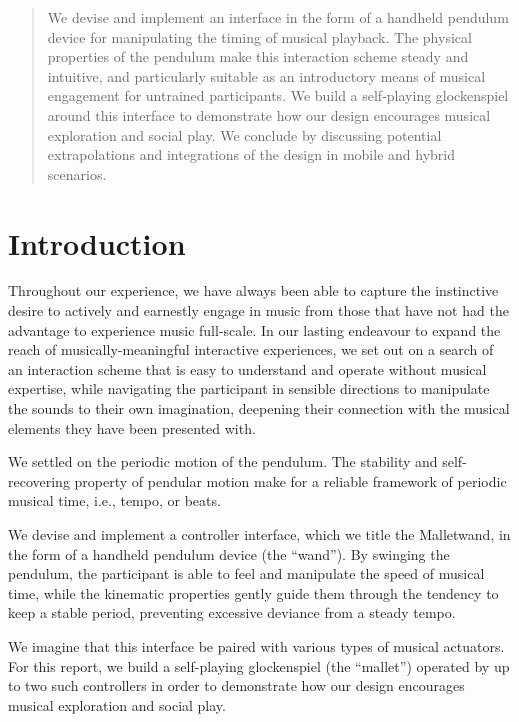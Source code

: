 \documentclass{nime-alternate} %
\begin{document}
\begin{abstract}
We devise and implement an interface in the form of a handheld pendulum device for manipulating the timing of musical playback. The physical properties of the pendulum make this interaction scheme steady and intuitive, and particularly suitable as an introductory means of musical engagement for untrained participants. We build a self-playing glockenspiel around this interface to demonstrate how our design encourages musical exploration and social play. We conclude by discussing potential extrapolations and integrations of the design in mobile and hybrid scenarios.
\end{abstract}

\printccsdesc


\section{Introduction}

Throughout our experience, we have always been able to capture the instinctive desire to actively and earnestly engage in music from those that have not had the advantage to experience music full-scale.
In our lasting endeavour to expand the reach of musically-meaningful interactive experiences, we set out on a search of an interaction scheme that is easy to understand and operate without musical expertise, while navigating the participant in sensible directions to manipulate the sounds to their own imagination, deepening their connection with the musical elements they have been presented with.

We settled on the periodic motion of the pendulum. The stability and self-recovering property of pendular motion make for a reliable framework of periodic musical time, i.e., tempo, or beats.

We devise and implement a controller interface, which we title the Malletwand, in the form of a handheld pendulum device (the ``wand''). By swinging the pendulum, the participant is able to feel and manipulate the speed of musical time, while the kinematic properties gently guide them through the tendency to keep a stable period, preventing excessive deviance from a steady tempo.

We imagine that this interface be paired with various types of musical actuators. For this report, we build a self-playing glockenspiel (the ``mallet'') operated by up to two such controllers in order to demonstrate how our design encourages musical exploration and social play.
\end{document}
